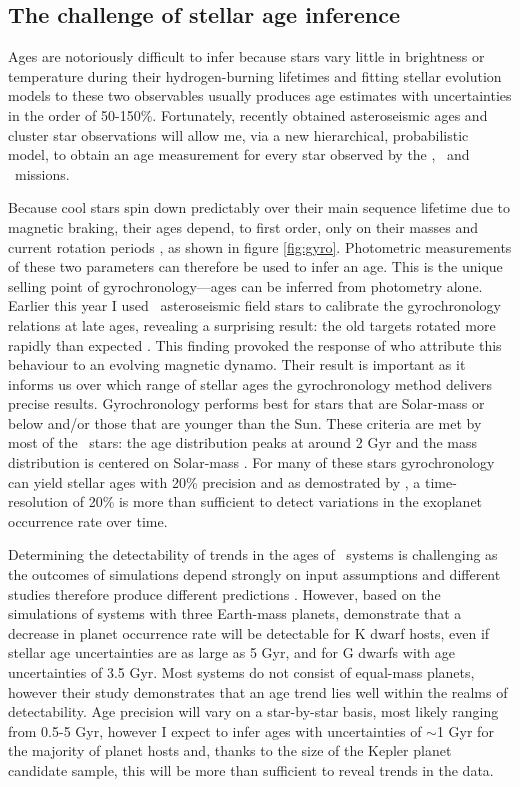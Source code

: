 \subsection*{The challenge of stellar age inference}

Ages are notoriously difficult to infer because stars vary little in brightness
or temperature during their hydrogen-burning lifetimes and fitting stellar
evolution models to these two observables usually produces age estimates with
uncertainties in the order of 50-150\%.
Fortunately, recently obtained asteroseismic ages and cluster star
observations will allow me, via a new hierarchical, probabilistic model,
to obtain an age measurement for every star observed by the \kepler,
\Ktwo\ and \TESS\ missions.

Because cool stars spin down predictably over their main sequence lifetime
due to magnetic braking, their ages depend, to first order, only on
their masses and current rotation periods \citep[e.g.][]{skumanich, kawaler,
barnes}, as shown in figure \ref{fig:gyro}.
Photometric measurements of these two parameters can therefore be used to
infer an age.
This is the unique selling point of gyrochronology---ages can be inferred from
photometry alone.
Earlier this year I used \Kepler\ asteroseismic field stars to calibrate
the gyrochronology relations at late ages, revealing a surprising result: the
old targets rotated more rapidly than expected \citep{angus}.
This finding provoked the response of \citet{vansaders} who attribute this
behaviour to an evolving magnetic dynamo.
Their result is important as it informs us over which range of stellar ages
the gyrochronology method delivers precise results.
Gyrochronology performs best for stars that are Solar-mass or below and/or
those that are younger than the Sun.
These criteria are met by most of the \Kepler\ stars: the age distribution
peaks at around 2 Gyr and the mass distribution is centered on Solar-mass
\citep{walk, mcquillan2014}.
For many of these stars gyrochronology can yield stellar ages with 20\%
precision \citep{epstein} and as demostrated by \citet{veras},
a time-resolution of 20\% is more than sufficient to detect variations in the
exoplanet occurrence rate over time.

Determining the detectability of trends in the ages of \Kepler\ systems is
challenging as the outcomes of simulations depend strongly on input
assumptions and different studies therefore produce different predictions
\citep[see figure 3 of][]{Pu2015}.
However, based on the \citet{smith} simulations of systems with three
Earth-mass planets, \citet{veras} demonstrate that a decrease in planet
occurrence rate will be detectable for K dwarf hosts, even if stellar age
uncertainties are as large as 5 Gyr, and for G dwarfs with age uncertainties of
3.5 Gyr.
Most systems do not consist of equal-mass planets, however their study
demonstrates that an age trend lies well within the realms of detectability.
Age precision will vary on a star-by-star basis, most likely ranging from
0.5-5 Gyr, however I expect to infer ages with uncertainties of $\sim$1 Gyr
for the majority of planet hosts and, thanks to the size of the Kepler planet
candidate sample, this will be more than sufficient to reveal trends in the
data.


